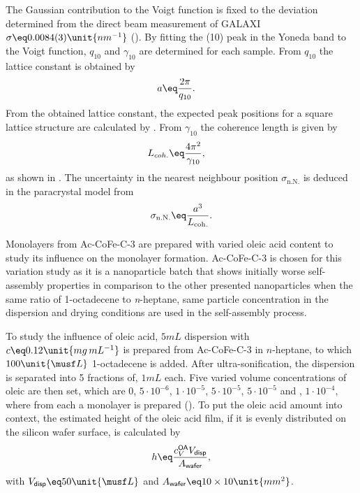 \documentclass[\main/dresen_thesis.tex]{subfiles}
\begin{document}
      The Gaussian contribution to the Voigt function is fixed to the deviation determined from the direct beam measurement of GALAXI $\sigma \eq 0.0084(3) \unit{nm^{-1}}$ ().
      By fitting the (10) peak in the Yoneda band to the Voigt function, $q_{10}$ and $\gamma_{10}$ are determined for each sample.
      From $q_{10}$ the lattice constant is obtained by
      \begin{align}
        a &\eq \frac{2 \pi}{q_{10}}.
      \end{align}
      From the obtained lattice constant, the expected peak positions for a square lattice structure are calculated by .
      From $\gamma_{10}$ the coherence length is given by
      \begin{align}
        L_{coh.} &\eq \frac{4 \pi^2}{\gamma_{10}},
      \end{align}
      as shown in .
      The uncertainty in the nearest neighbour position $\sigma_{\mathrm{n.N.}}$ is deduced in the paracrystal model from
      \begin{align}
        \sigma_{\mathrm{n.N.}} \eq \frac{a^3}{L_\mathrm{coh.}}.
      \end{align}

      Monolayers from Ac-CoFe-C-3 are prepared with varied oleic acid content to study its influence on the monolayer formation.
      Ac-CoFe-C-3 is chosen for this variation study as it is a nanoparticle batch that shows initially worse self-assembly properties in comparison to the other presented nanoparticles when the same ratio of 1-octadecene to \textit{n}-heptane, same particle concentration in the dispersion and drying conditions are used in the self-assembly process.

      To study the influence of oleic acid, $5 \unit{mL}$ dispersion with $c \eq 0.12 \unit{mg \, mL^{-1}}$ is prepared from Ac-CoFe-C-3 in $\mathit{n}$-heptane, to which $100 \unit{\musf L}$ 1-octadecene is added.
      After ultra-sonification, the dispersion is separated into 5 fractions of, $1 \unit{mL}$ each.
      Five varied volume concentrations of oleic are then set, which are $0$, $5 \cdot 10^{-6}$, $1 \cdot 10^{-5}$, $5 \cdot 10^{-5}$, $5 \cdot 10^{-5}$ and , $1 \cdot 10^{-4}$, where from each a monolayer is prepared ().
      To put the oleic acid amount into context, the estimated height of the oleic acid film, if it is evenly distributed on the silicon wafer surface, is calculated by
      \begin{align}
        \label{eq:monolayers:preparation:solventVariation:OAAddend}
        h \eq \frac{c_V^\textsf{OA} V_\textsf{disp}}{A_\textsf{wafer}},
      \end{align}
      with $V_\textsf{disp} \eq 50 \unit{\musf L}$ and $A_\textsf{wafer} \eq 10 \times 10 \unit{mm^2}$.
\end{document}
